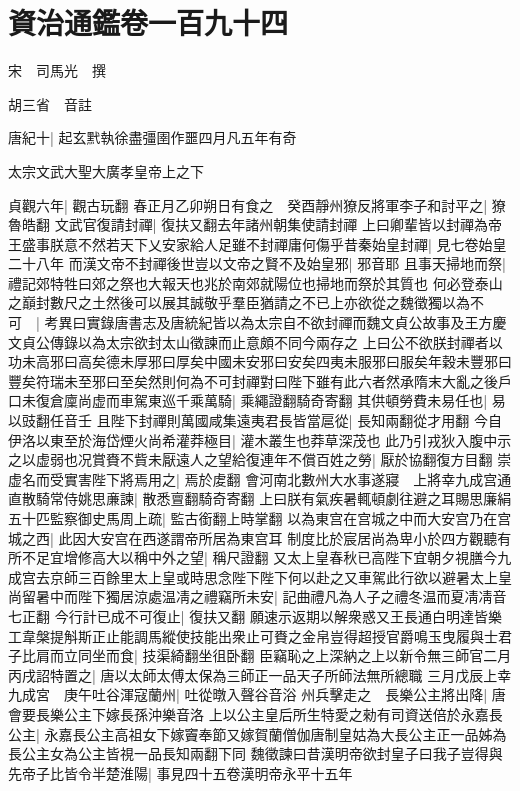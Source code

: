 \section{資治通鑑卷一百九十四}
宋　司馬光　撰

胡三省　音註

唐紀十|{
	起玄黓執徐盡彊圉作噩四月凡五年有奇}


太宗文武大聖大廣孝皇帝上之下

貞觀六年|{
	觀古玩翻}
春正月乙卯朔日有食之　癸酉靜州獠反將軍李子和討平之|{
	獠魯皓翻}
文武官復請封禪|{
	復扶又翻去年諸州朝集使請封禪}
上曰卿輩皆以封禪為帝王盛事朕意不然若天下乂安家給人足雖不封禪庸何傷乎昔秦始皇封禪|{
	見七卷始皇二十八年}
而漢文帝不封禪後世豈以文帝之賢不及始皇邪|{
	邪音耶}
且事天掃地而祭|{
	禮記郊特牲曰郊之祭也大報天也兆於南郊就陽位也掃地而祭於其質也}
何必登泰山之巔封數尺之土然後可以展其誠敬乎羣臣猶請之不已上亦欲從之魏徵獨以為不可　|{
	考異曰實錄唐書志及唐統紀皆以為太宗自不欲封禪而魏文貞公故事及王方慶文貞公傳錄以為太宗欲封太山徵諫而止意頗不同今兩存之}
上曰公不欲朕封禪者以功未高邪曰高矣德未厚邪曰厚矣中國未安邪曰安矣四夷未服邪曰服矣年穀未豐邪曰豐矣符瑞未至邪曰至矣然則何為不可封禪對曰陛下雖有此六者然承隋末大亂之後戶口未復倉廩尚虚而車駕東巡千乘萬騎|{
	乘繩證翻騎奇寄翻}
其供頓勞費未易任也|{
	易以豉翻任音壬}
且陛下封禪則萬國咸集遠夷君長皆當扈從|{
	長知兩翻從才用翻}
今自伊洛以東至於海岱煙火尚希灌莽極目|{
	灌木叢生也莽草深茂也}
此乃引戎狄入腹中示之以虚弱也况賞賚不貲未厭遠人之望給復連年不償百姓之勞|{
	厭於協翻復方目翻}
崇虚名而受實害陛下將焉用之|{
	焉於䖍翻}
會河南北數州大水事遂寢　上將幸九成宫通直散騎常侍姚思亷諫|{
	散悉亶翻騎奇寄翻}
上曰朕有氣疾暑輒頓劇往避之耳賜思廉絹五十匹監察御史馬周上疏|{
	監古銜翻上時掌翻}
以為東宫在宫城之中而大安宫乃在宫城之西|{
	此因大安宫在西遂謂帝所居為東宫耳}
制度比於宸居尚為卑小於四方觀聽有所不足宜增修高大以稱中外之望|{
	稱尺證翻}
又太上皇春秋已高陛下宜朝夕視膳今九成宫去京師三百餘里太上皇或時思念陛下陛下何以赴之又車駕此行欲以避暑太上皇尚留暑中而陛下獨居涼處温凊之禮竊所未安|{
	記曲禮凡為人子之禮冬温而夏凊凊音七正翻}
今行計已成不可復止|{
	復扶又翻}
願速示返期以解衆惑又王長通白明達皆樂工韋槃提斛斯正止能調馬縱使技能出衆止可賚之金帛豈得超授官爵鳴玉曳履與士君子比肩而立同坐而食|{
	技渠綺翻坐徂卧翻}
臣竊恥之上深納之上以新令無三師官二月丙戌詔特置之|{
	唐以太師太傅太保為三師正一品天子所師法無所總職}
三月戊辰上幸九成宮　庚午吐谷渾寇蘭州|{
	吐從暾入聲谷音浴}
州兵擊走之　長樂公主將出降|{
	唐會要長樂公主下嫁長孫沖樂音洛}
上以公主皇后所生特愛之勑有司資送倍於永嘉長公主|{
	永嘉長公主高祖女下嫁竇奉節又嫁賀蘭僧伽唐制皇姑為大長公主正一品姊為長公主女為公主皆視一品長知兩翻下同}
魏徵諫曰昔漢明帝欲封皇子曰我子豈得與先帝子比皆令半楚淮陽|{
	事見四十五卷漢明帝永平十五年}
